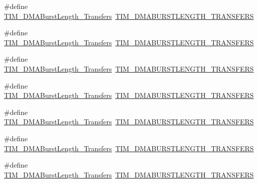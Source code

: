 \begin{DoxyCompactItemize}
\item 
\#define \hyperlink{group___h_a_l___t_i_m___aliased___defines_ga3a99863a0925e0cc9a11b91aade66f11}{T\+I\+M\+\_\+\+D\+M\+A\+Burst\+Length\+\_\+Transfers}~\hyperlink{group___t_i_m___d_m_a___burst___length_gad91c14f0930803593ecdbd98002fea0a}{T\+I\+M\+\_\+\+D\+M\+A\+B\+U\+R\+S\+T\+L\+E\+N\+G\+T\+H\+\_\+T\+R\+A\+N\+S\+F\+E\+RS}
\item 
\#define \hyperlink{group___h_a_l___t_i_m___aliased___defines_ga84bfeb309593a1ac580e233bf7514b36}{T\+I\+M\+\_\+\+D\+M\+A\+Burst\+Length\+\_\+Transfers}~\hyperlink{group___t_i_m___d_m_a___burst___length_ga9ada9605ae6ff6e4ada9701263bef812}{T\+I\+M\+\_\+\+D\+M\+A\+B\+U\+R\+S\+T\+L\+E\+N\+G\+T\+H\+\_\+T\+R\+A\+N\+S\+F\+E\+RS}
\item 
\#define \hyperlink{group___h_a_l___t_i_m___aliased___defines_ga44f8aa51fbe8887a5f3c37a0e776902c}{T\+I\+M\+\_\+\+D\+M\+A\+Burst\+Length\+\_\+Transfers}~\hyperlink{group___t_i_m___d_m_a___burst___length_ga740a6446c0a517cc3e235fddee45fef5}{T\+I\+M\+\_\+\+D\+M\+A\+B\+U\+R\+S\+T\+L\+E\+N\+G\+T\+H\+\_\+T\+R\+A\+N\+S\+F\+E\+RS}
\item 
\#define \hyperlink{group___h_a_l___t_i_m___aliased___defines_ga8be40a21654eea72e9c1bf9922675b22}{T\+I\+M\+\_\+\+D\+M\+A\+Burst\+Length\+\_\+Transfers}~\hyperlink{group___t_i_m___d_m_a___burst___length_ga905c206d2a028e3fb92bcab8f9f7c869}{T\+I\+M\+\_\+\+D\+M\+A\+B\+U\+R\+S\+T\+L\+E\+N\+G\+T\+H\+\_\+T\+R\+A\+N\+S\+F\+E\+RS}
\item 
\#define \hyperlink{group___h_a_l___t_i_m___aliased___defines_gaf2ae83bd73b0e92b73e5ebfc11f9bfad}{T\+I\+M\+\_\+\+D\+M\+A\+Burst\+Length\+\_\+Transfers}~\hyperlink{group___t_i_m___d_m_a___burst___length_gae75055ac13b73baf9326f1d6157853a7}{T\+I\+M\+\_\+\+D\+M\+A\+B\+U\+R\+S\+T\+L\+E\+N\+G\+T\+H\+\_\+T\+R\+A\+N\+S\+F\+E\+RS}
\item 
\#define \hyperlink{group___h_a_l___t_i_m___aliased___defines_ga8a760d7114425596736b0ecdbe5fdea6}{T\+I\+M\+\_\+\+D\+M\+A\+Burst\+Length\+\_\+Transfers}~\hyperlink{group___t_i_m___d_m_a___burst___length_gac6b24f5b7d9e1968b4bfcaeb24e718fc}{T\+I\+M\+\_\+\+D\+M\+A\+B\+U\+R\+S\+T\+L\+E\+N\+G\+T\+H\+\_\+T\+R\+A\+N\+S\+F\+E\+RS}
\item 
\#define \hyperlink{group___h_a_l___t_i_m___aliased___defines_ga98b208205c133557a9d67a0921559a66}{T\+I\+M\+\_\+\+D\+M\+A\+Burst\+Length\+\_\+Transfers}~\hyperlink{group___t_i_m___d_m_a___burst___length_ga73fff75a3f0247c61a84a42e8cb83572}{T\+I\+M\+\_\+\+D\+M\+A\+B\+U\+R\+S\+T\+L\+E\+N\+G\+T\+H\+\_\+T\+R\+A\+N\+S\+F\+E\+RS}

\end{DoxyCompactItemize}
